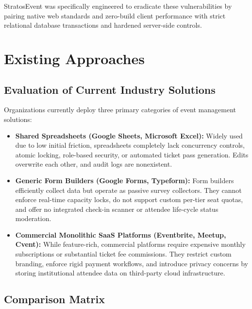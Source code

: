 \documentclass[11pt,a4paper]{article}
\begin{document}
StratosEvent was specifically engineered to eradicate these vulnerabilities by pairing native web standards and zero-build client performance with strict relational database transactions and hardened server-side controls.

\newpage
\section*{{\color{TitleBlue}\bfseries
\fontsize{18}{22}\selectfont Existing Approaches}}

\subsection*{Evaluation of Current Industry Solutions}
\justifying

Organizations currently deploy three primary categories of event management solutions:

\begin{itemize}[leftmargin=*]
    \item \textbf{Shared Spreadsheets (Google Sheets, Microsoft Excel):} Widely used due to low initial friction, spreadsheets completely lack concurrency controls, atomic locking, role-based security, or automated ticket pass generation. Edits overwrite each other, and audit logs are nonexistent.
    \item \textbf{Generic Form Builders (Google Forms, Typeform):} Form builders efficiently collect data but operate as passive survey collectors. They cannot enforce real-time capacity locks, do not support custom per-tier seat quotas, and offer no integrated check-in scanner or attendee life-cycle status moderation.
    \item \textbf{Commercial Monolithic SaaS Platforms (Eventbrite, Meetup, Cvent):} While feature-rich, commercial platforms require expensive monthly subscriptions or substantial ticket fee commissions. They restrict custom branding, enforce rigid payment workflows, and introduce privacy concerns by storing institutional attendee data on third-party cloud infrastructure.
\end{itemize}

\vspace{0.10in}
\subsection*{Comparison Matrix}
\begingroup
\fontsize{9}{11.5}\selectfont
\renewcommand{\arraystretch}{1.4}
\setlength{\tabcolsep}{4pt}
\end{document}
